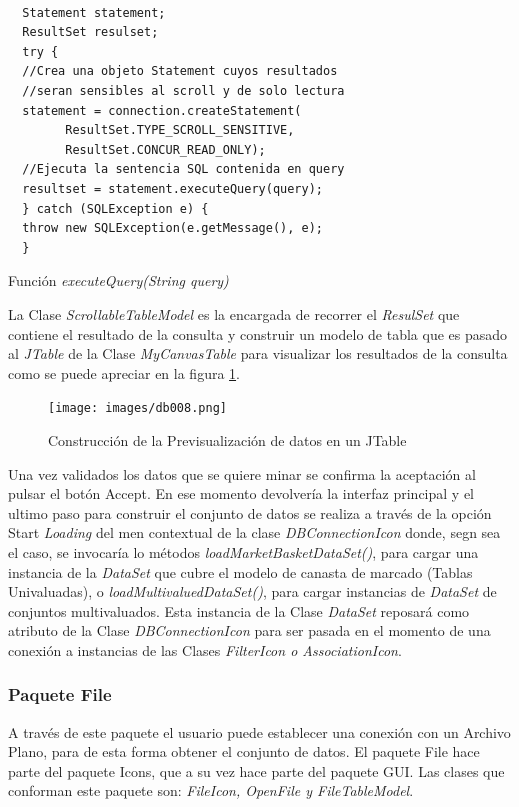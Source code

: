 \begin{codigof}[t]
\begin{verbatim}

  Statement statement;
  ResultSet resulset;
  try {
  //Crea una objeto Statement cuyos resultados
  //seran sensibles al scroll y de solo lectura
  statement = connection.createStatement(
        ResultSet.TYPE_SCROLL_SENSITIVE,
        ResultSet.CONCUR_READ_ONLY);
  //Ejecuta la sentencia SQL contenida en query
  resultset = statement.executeQuery(query);
  } catch (SQLException e) {
  throw new SQLException(e.getMessage(), e);
  }
\end{verbatim}
\caption{Funci\'on \textit{executeQuery(String query)}}
\label{codCone1}
\end{codigof}

La Clase \textit{ScrollableTableModel} es la encargada de recorrer el \textit{ResulSet} que contiene el resultado
de la consulta y construir un modelo de tabla que es pasado al \textit{JTable} de la Clase \textit{MyCanvasTable}
para visualizar los resultados de la consulta como se puede apreciar en la figura \ref{db008}.\\

\begin{figure}[h]
\centering
\texttt{[image: images/db008.png]}         
\caption{Construcci\'on de la Previsualizaci\'on de datos en un JTable}
\label{db008}
\end{figure}

Una vez validados los datos que se quiere minar se confirma la aceptaci\'on al pulsar el bot\'on Accept.  En ese
momento devolver\'ia la interfaz principal y el ultimo paso para construir el conjunto de datos se realiza a
trav\'es de la opci\'on Start \textit{Loading} del men contextual de la clase \textit{DBConnectionIcon} donde,
segn sea el caso, se invocar\'ia lo m\'etodos \textit{loadMarketBasketDataSet()}, para cargar una instancia de
la \textit{DataSet} que cubre el modelo de canasta de marcado (Tablas Univaluadas), o
\textit{loadMultivaluedDataSet()}, para cargar instancias de \textit{DataSet} de conjuntos multivaluados.  Esta
instancia de la Clase \textit{DataSet} reposar\'a como atributo de la Clase \textit{DBConnectionIcon} para ser
pasada en el momento de una conexi\'on a instancias de las Clases \textit{FilterIcon o AssociationIcon}.\\

\subsubsection{Paquete File}
A trav\'es de este paquete el usuario puede establecer una conexi\'on con un Archivo Plano, para de esta forma
obtener el conjunto de datos. El paquete File hace parte del paquete Icons, que a su vez hace parte del paquete
GUI. Las clases que conforman este paquete son: \textit{FileIcon, OpenFile y FileTableModel}.\\

